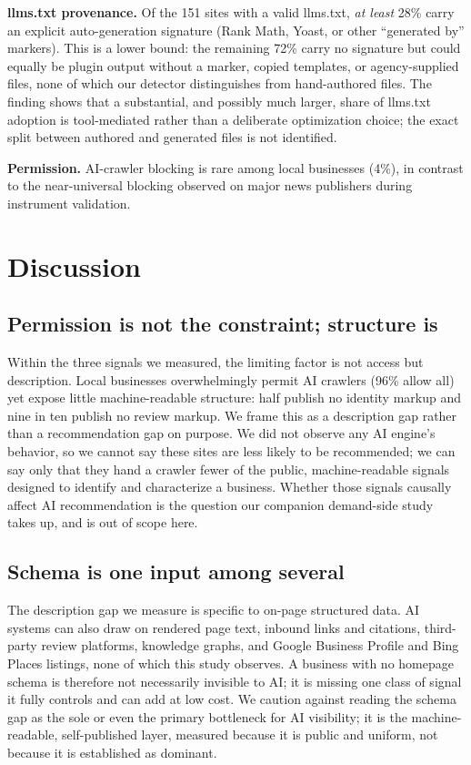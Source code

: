 \documentclass[11pt]{article}
\begin{document}
\medskip
\noindent\textbf{llms.txt provenance.} Of the 151 sites with a valid llms.txt, \emph{at least} 28\%
carry an explicit auto-generation signature (Rank Math, Yoast, or other ``generated by'' markers).
This is a lower bound: the remaining 72\% carry no signature but could equally be plugin output
without a marker, copied templates, or agency-supplied files, none of which our detector
distinguishes from hand-authored files. The finding shows that a substantial, and possibly much
larger, share of llms.txt adoption is tool-mediated rather than a deliberate optimization choice; the
exact split between authored and generated files is not identified.

\medskip
\noindent\textbf{Permission.} AI-crawler blocking is rare among local businesses (4\%), in contrast
to the near-universal blocking observed on major news publishers during instrument validation.

\section{Discussion}

\subsection{Permission is not the constraint; structure is}
Within the three signals we measured, the limiting factor is not access but description. Local
businesses overwhelmingly permit AI crawlers (96\% allow all) yet expose little machine-readable
structure: half publish no identity markup and nine in ten publish no review markup. We frame this as
a description gap rather than a recommendation gap on purpose. We did not observe any AI engine's
behavior, so we cannot say these sites are less likely to be recommended; we can say only that they
hand a crawler fewer of the public, machine-readable signals designed to identify and characterize a
business. Whether those signals causally affect AI recommendation is the question our companion
demand-side study takes up, and is out of scope here.

\subsection{Schema is one input among several}
The description gap we measure is specific to on-page structured data. AI systems can also draw on
rendered page text, inbound links and citations, third-party review platforms, knowledge graphs, and
Google Business Profile and Bing Places listings, none of which this study observes. A business with
no homepage schema is therefore not necessarily invisible to AI; it is missing one class of signal it
fully controls and can add at low cost. We caution against reading the schema gap as the sole or even
the primary bottleneck for AI visibility; it is the machine-readable, self-published layer, measured
because it is public and uniform, not because it is established as dominant.
\end{document}
